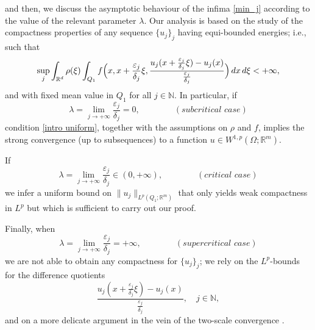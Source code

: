 \documentclass{article}
\theoremstyle{definition}
\newcommand{\ej}{\varepsilon_j}
\newcommand{\dej}{\delta_j}
\newcommand{\N}{\mathbb{N}}
\newcommand{\R}{\mathbb{R}}
\begin{document}
and then, we discuss the asymptotic behaviour of the infima \eqref{min_j} according to the value of the relevant parameter $\lambda$. Our analysis is based on the study of the compactness properties of any sequence $\{u_j\}_j$ having equi-bounded energies; i.e., such that
\begin{equation}\label{intro uniform}
    \sup_j \int_{\R^d} \rho(\xi)\int_{Q_1} f\Bigl(x,x+\frac{\ej}{\dej}\xi,\frac{u_j(x+\frac{\ej}{\dej}\xi)-u_j(x)}{\frac{\ej}{\dej}}\Bigr)\, dx\,d\xi <+\infty,
\end{equation}
and with fixed mean value in $Q_1$ for all $j\in\N$. In particular, if 
    \begin{equation*}
        \lambda=\lim_{j\to+\infty}\frac{\ej}{\dej}= 0, \qquad \qquad (\textit{subcritical case})
    \end{equation*}
    condition \eqref{intro uniform}, together with the assumptions on $\rho$ and $f$, implies the strong convergence (up to subsequences) to a function $u\in W^{1,p}(\Omega;\R^m)$.
    
    If 
    \begin{equation*}
        \lambda=\lim_{j\to+\infty}\frac{\ej}{\dej}\in (0, +\infty), \qquad \qquad (\textit{critical case})
    \end{equation*}
    we infer a uniform bound on $\|u_j\|_{L^p(Q_1;\R^m)}$ that only yields weak compactness in $L^p$ but which is sufficient to carry out our proof.
    
     Finally, when
     \begin{equation*}
        \lambda=\lim_{j\to+\infty}\frac{\ej}{\dej}=+\infty, \qquad \qquad (\textit{supercritical case})
    \end{equation*}
    we are not able to obtain any compactness for $\{u_j\}_j$; we rely on the $L^p$-bounds for the difference quotients
    \begin{equation}\label{diffquot}
        \frac{u_j(x+\frac{\ej}{\dej}\xi)-u_j(x)}{\frac{\ej}{\dej}}, \quad j\in\N,
    \end{equation}
    and on a more delicate argument in the vein of the two-scale convergence \cite{A,N}.

\smallskip
\end{document}
